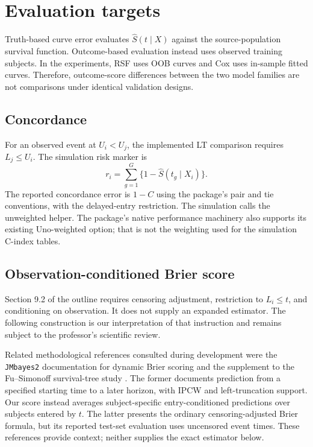 \section{Evaluation targets}
Truth-based curve error evaluates $\widehat S(t\mid X)$ against the
source-population survival function. Outcome-based evaluation instead uses
observed training subjects. In the experiments, RSF uses OOB curves and Cox
uses in-sample fitted curves. Therefore, outcome-score differences between
the two model families are not comparisons under identical validation designs.

\subsection{Concordance}
For an observed event at $U_i<U_j$, the implemented LT comparison requires
$L_j\leq U_i$. The simulation risk marker is
\[
 r_i=\sum_{g=1}^{G}\{1-\widehat S(t_g\mid X_i)\}.
\]
The reported concordance error is $1-C$ using the package's pair and
tie conventions, with the delayed-entry restriction. The simulation calls
the unweighted helper. The package's native performance machinery also
supports its existing Uno-weighted option; that is not the weighting used
for the simulation C-index tables.

\subsection{Observation-conditioned Brier score}
Section 9.2 of the outline \citep{projectoutline} requires censoring adjustment, restriction to
$L_i\leq t$, and conditioning on observation. It does not supply an expanded
estimator. The following construction is our interpretation of that
instruction and remains subject to the professor's scientific review.

Related methodological references consulted during development were the
\texttt{JMbayes2} documentation for dynamic Brier scoring
\citep{jmbayes2brier} and the supplement to the Fu--Simonoff survival-tree
study \citep[Section~4.1]{fuSimonoffSupplement}.
The former documents prediction from a specified starting time to a later
horizon, with IPCW and left-truncation support. Our score instead averages
subject-specific entry-conditioned predictions over subjects entered by $t$.
The latter presents the ordinary censoring-adjusted Brier formula, but its
reported test-set evaluation uses uncensored event times.
These references provide context; neither supplies the exact estimator below.

